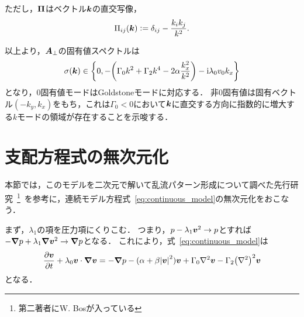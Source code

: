 \documentclass[12pt,dvipdfmx,svgnames,a4paper,uplatex]{ujarticle}
\theoremstyle{plain}
\begin{document}
ただし，\(\vb*{\Pi}\)はベクトル\(\vb*{k}\)の直交写像，
\begin{equation}
  \Pi_{ij}(\vb*{k}) \vcentcolon= \delta_{ij} - \frac{k_i k_j}{k^2}.
  \label{eq:Pi}
\end{equation}

以上より，\(\vb*{A}_\bot\)の固有値スペクトルは
\begin{equation}
  \sigma(\vb*{k}) \in \qty{ 0, -\qty( \Gamma_0 k^2 + \Gamma_2 k^4 -2\alpha \frac{k_x^2}{k^2} ) -\mathrm{i} \lambda_0 v_0 k_x }
  \label{eq:eigenvalue_specrum}
\end{equation}
となり，\(0\)固有値モードはGoldstoneモードに対応する．
非\(0\)固有値は固有ベクトル\((-k_y, k_x)\)をもち，これは\(\Gamma_0 < 0\)において\(\vb*{k}\)に直交する方向に指数的に増大する\(k\)モードの領域が存在することを示唆する．


\section{支配方程式の無次元化}
\label{sec:governing_equation_nondimensionalisation}

本節では，このモデルを二次元で解いて乱流パターン形成について調べた先行研究~\footnote{第二著者にW. Bosが入っている}~\cite[脚注28]{James2017}を参考に，連続モデル方程式~\ref{eq:continuous_model}の無次元化をおこなう．

まず，\(\lambda_1\)の項を圧力項にくりこむ．
つまり，\(p - \lambda_1 \vb*{v}^2 \to p\)とすれば\(-\grad{p} + \lambda_1 \grad{\vb*{v}^2} \to \grad{p}\)となる．
これにより，式~\ref{eq:continuous_model}は
\begin{equation}
  \pdv{\vb*{v}}{t} + \lambda_0 \vb*{v} \cdot \grad{\vb*{v}} = -\grad{p} - (\alpha + \beta \abs{\vb*{v}}^2) \vb*{v} + \Gamma_0 \laplacian \vb*{v} - \Gamma_2 \qty(\laplacian)^2 \vb*{v}
  \label{eq:continuous_model_absorb_lambda1}
\end{equation}
となる．
\end{document}
